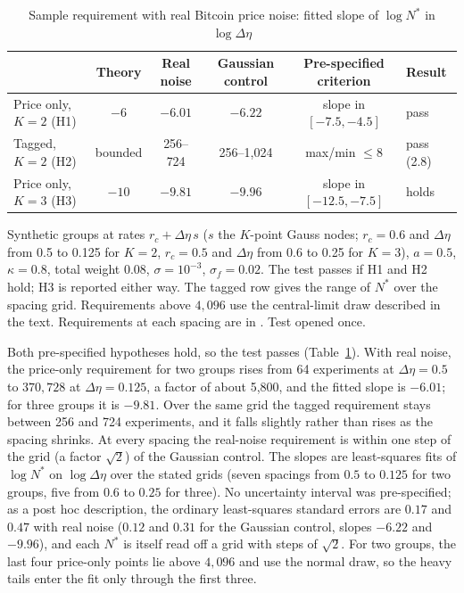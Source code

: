 \documentclass[12pt]{article}
\theoremstyle{definition}
\theoremstyle{remark}
\begin{document}
\begin{table}[t]\centering\small
\begin{threeparttable}
\caption{Sample requirement with real Bitcoin price noise: fitted slope of $\log N^*$ in $\log\Delta\eta$}\label{tab:injection}
\begin{tabular}{lccccl}
\toprule
 & Theory & Real noise & Gaussian control & Pre-specified criterion & Result\\
\midrule
Price only, $K=2$ (H1) & $-6$ & $-6.01$ & $-6.22$ & slope in $[-7.5,-4.5]$ & pass\\
Tagged, $K=2$ (H2) & bounded & 256--724 & 256--1{,}024 & max/min $\le8$ & pass (2.8)\\
Price only, $K=3$ (H3) & $-10$ & $-9.81$ & $-9.96$ & slope in $[-12.5,-7.5]$ & holds\\
\bottomrule
\end{tabular}
\begin{tablenotes}\footnotesize\item Synthetic groups at rates $r_c+\Delta\eta\,s$ ($s$ the $K$-point Gauss nodes; $r_c=0.6$ and $\Delta\eta$ from 0.5 to 0.125 for $K=2$, $r_c=0.5$ and $\Delta\eta$ from 0.6 to 0.25 for $K=3$), $a=0.5$, $\kappa=0.8$, total weight 0.08, $\sigma=10^{-3}$, $\sigma_f=0.02$. The test passes if H1 and H2 hold; H3 is reported either way. The tagged row gives the range of $N^*$ over the spacing grid. Requirements above $4{,}096$ use the central-limit draw described in the text. Requirements at each spacing are in \citet{niroula2026a}. Test opened once.\end{tablenotes}
\end{threeparttable}
\end{table}

Both pre-specified hypotheses hold, so the test passes (Table~\ref{tab:injection}). With real noise, the price-only requirement for two groups rises from 64 experiments at $\Delta\eta=0.5$ to $370{,}728$ at $\Delta\eta=0.125$, a factor of about 5{,}800, and the fitted slope is $-6.01$; for three groups it is $-9.81$. Over the same grid the tagged requirement stays between 256 and 724 experiments, and it falls slightly rather than rises as the spacing shrinks. At every spacing the real-noise requirement is within one step of the grid (a factor $\sqrt2$) of the Gaussian control. The slopes are least-squares fits of $\log N^*$ on $\log\Delta\eta$ over the stated grids (seven spacings from $0.5$ to $0.125$ for two groups, five from $0.6$ to $0.25$ for three). No uncertainty interval was pre-specified; as a post hoc description, the ordinary least-squares standard errors are $0.17$ and $0.47$ with real noise ($0.12$ and $0.31$ for the Gaussian control, slopes $-6.22$ and $-9.96$), and each $N^*$ is itself read off a grid with steps of $\sqrt2$. For two groups, the last four price-only points lie above $4{,}096$ and use the normal draw, so the heavy tails enter the fit only through the first three.
\end{document}
